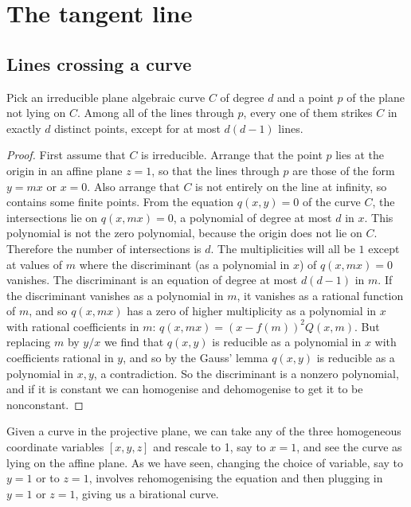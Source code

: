 \chapter{The tangent line}\label{chapter:tangent.line}

\section{Lines crossing a curve}
\begin{proposition}\label{proposition:lines.crossing}
Pick an irreducible plane algebraic curve \(C\) of degree \(d\) and a point \(p\) of the plane not lying on \(C\).
Among all of the lines through \(p\), every one of them strikes \(C\) in exactly \(d\) distinct points, except for at most \(d(d-1)\) lines.
\end{proposition}
\begin{proof}
First assume that \(C\) is irreducible.
Arrange that the point \(p\) lies at the origin in an affine plane \(z=1\), so that the lines through \(p\) are those of the form \(y=mx\) or \(x=0\).
Also arrange that \(C\) is not entirely on the line at infinity, so contains some finite points.
From the equation \(q(x,y)=0\) of the curve \(C\), the intersections lie on \(q(x,mx)=0\), a polynomial of degree at most \(d\) in \(x\).
This polynomial is not the zero polynomial, because the origin does not lie on \(C\).
Therefore the number of intersections is \(d\).
The multiplicities will all be \(1\) except at values of \(m\) where the discriminant (as a polynomial in \(x\)) of \(q(x,mx)=0\) vanishes.
The discriminant is an equation of degree at most \(d(d-1)\) in \(m\).
If the discriminant vanishes as a polynomial in \(m\), it vanishes as a rational function of \(m\), and so \(q(x,mx)\) has a zero of higher multiplicity as a polynomial in \(x\) with rational coefficients in \(m\): \(q(x,mx)=(x-f(m))^2 Q(x,m)\).
But replacing \(m\) by \(y/x\) we find that \(q(x,y)\) is reducible as a polynomial in \(x\) with coefficients rational in \(y\), and so by the Gauss' lemma \(q(x,y)\) is reducible as a polynomial in \(x,y\), a contradiction.
So the discriminant is a nonzero polynomial, and if it is constant we can homogenise and dehomogenise to get it to be nonconstant.
\end{proof}

Given a curve in the projective plane, we can take any of the three homogeneous coordinate variables \([x,y,z]\) and rescale to 1, say to \(x=1\), and see the curve as lying on the affine plane.
As we have seen, changing the choice of variable, say to \(y=1\) or to \(z=1\), involves rehomogenising the equation and then plugging in \(y=1\) or \(z=1\), giving us a birational curve.

